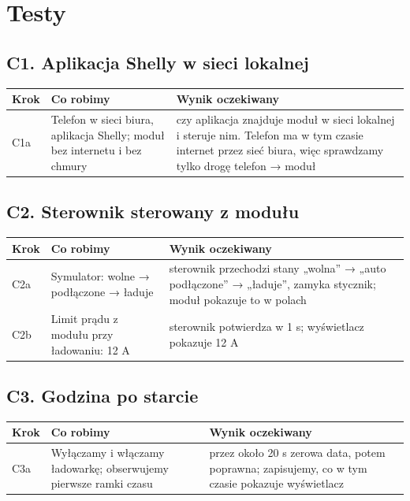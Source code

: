 \documentclass[11pt,a4paper]{article}
\begin{document}
\clearpage

\section{Testy}

\subsection{C1. Aplikacja Shelly w sieci lokalnej}

\begin{longtable}{>{\raggedright\arraybackslash}p{3.00cm}>{\raggedright\arraybackslash}p{4.98cm}>{\raggedright\arraybackslash}p{7.30cm}}
\toprule
\rowcolor{apteallight}\textbf{Krok} & \textbf{Co robimy} & \textbf{Wynik oczekiwany} \\
\midrule\endhead
\bottomrule\endfoot
C1a & Telefon w sieci biura, aplikacja Shelly; moduł bez internetu i bez chmury & czy aplikacja znajduje moduł w sieci lokalnej i steruje nim. Telefon ma w tym czasie internet przez sieć biura, więc sprawdzamy tylko drogę telefon {\symbolfont→} moduł \\
\end{longtable}

\subsection{C2. Sterownik sterowany z modułu}

\begin{longtable}{>{\raggedright\arraybackslash}p{3.00cm}>{\raggedright\arraybackslash}p{4.05cm}>{\raggedright\arraybackslash}p{8.23cm}}
\toprule
\rowcolor{apteallight}\textbf{Krok} & \textbf{Co robimy} & \textbf{Wynik oczekiwany} \\
\midrule\endhead
\bottomrule\endfoot
C2a & Symulator: wolne {\symbolfont→} podłączone {\symbolfont→} ładuje & sterownik przechodzi stany „wolna” {\symbolfont→} „auto podłączone” {\symbolfont→} „ładuje”, zamyka stycznik; moduł pokazuje to w polach \\
C2b & Limit prądu z modułu przy ładowaniu: 12 A & sterownik potwierdza w 1 s; wyświetlacz pokazuje 12 A \\
\end{longtable}

\subsection{C3. Godzina po starcie}

\begin{longtable}{>{\raggedright\arraybackslash}p{3.00cm}>{\raggedright\arraybackslash}p{4.90cm}>{\raggedright\arraybackslash}p{7.38cm}}
\toprule
\rowcolor{apteallight}\textbf{Krok} & \textbf{Co robimy} & \textbf{Wynik oczekiwany} \\
\midrule\endhead
\bottomrule\endfoot
C3a & Wyłączamy i włączamy ładowarkę; obserwujemy pierwsze ramki czasu & przez około 20 s zerowa data, potem poprawna; zapisujemy, co w tym czasie pokazuje wyświetlacz \\
\end{longtable}
\end{document}
